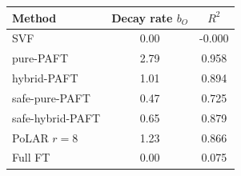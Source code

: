 \begin{tabular}{lcc}
\toprule
\textbf{Method} & \textbf{Decay rate $b_O$} & $R^2$ \\
\midrule
SVF & 0.00 & -0.000 \\
pure-PAFT & 2.79 & 0.958 \\
hybrid-PAFT & 1.01 & 0.894 \\
safe-pure-PAFT & 0.47 & 0.725 \\
safe-hybrid-PAFT & 0.65 & 0.879 \\
PoLAR $r{=}8$ & 1.23 & 0.866 \\
Full FT & 0.00 & 0.075 \\
\bottomrule
\end{tabular}